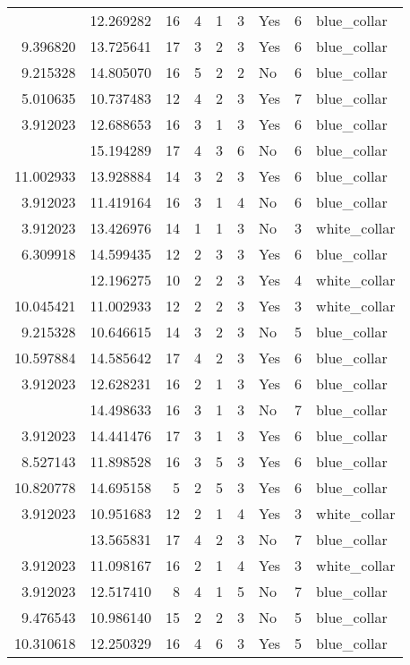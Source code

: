 \documentclass[
]{article}
\begin{document}
\begin{longtable}[t]{rrrrrllrl}
\addlinespace
3.912023 & 12.269282 & 16 & 4 & 1 & 3 & Yes & 6 & blue\_collar\\
9.396820 & 13.725641 & 17 & 3 & 2 & 3 & Yes & 6 & blue\_collar\\
9.215328 & 14.805070 & 16 & 5 & 2 & 2 & No & 6 & blue\_collar\\
5.010635 & 10.737483 & 12 & 4 & 2 & 3 & Yes & 7 & blue\_collar\\
3.912023 & 12.688653 & 16 & 3 & 1 & 3 & Yes & 6 & blue\_collar\\
\addlinespace
8.022897 & 15.194289 & 17 & 4 & 3 & 6 & No & 6 & blue\_collar\\
11.002933 & 13.928884 & 14 & 3 & 2 & 3 & Yes & 6 & blue\_collar\\
3.912023 & 11.419164 & 16 & 3 & 1 & 4 & No & 6 & blue\_collar\\
3.912023 & 13.426976 & 14 & 1 & 1 & 3 & No & 3 & white\_collar\\
6.309918 & 14.599435 & 12 & 2 & 3 & 3 & Yes & 6 & blue\_collar\\
\addlinespace
10.464531 & 12.196275 & 10 & 2 & 2 & 3 & Yes & 4 & white\_collar\\
10.045421 & 11.002933 & 12 & 2 & 2 & 3 & Yes & 3 & white\_collar\\
9.215328 & 10.646615 & 14 & 3 & 2 & 3 & No & 5 & blue\_collar\\
10.597884 & 14.585642 & 17 & 4 & 2 & 3 & Yes & 6 & blue\_collar\\
3.912023 & 12.628231 & 16 & 2 & 1 & 3 & Yes & 6 & blue\_collar\\
\addlinespace
3.912023 & 14.498633 & 16 & 3 & 1 & 3 & No & 7 & blue\_collar\\
3.912023 & 14.441476 & 17 & 3 & 1 & 3 & Yes & 6 & blue\_collar\\
8.527143 & 11.898528 & 16 & 3 & 5 & 3 & Yes & 6 & blue\_collar\\
10.820778 & 14.695158 & 5 & 2 & 5 & 3 & Yes & 6 & blue\_collar\\
3.912023 & 10.951683 & 12 & 2 & 1 & 4 & Yes & 3 & white\_collar\\
\addlinespace
14.077913 & 13.565831 & 17 & 4 & 2 & 3 & No & 7 & blue\_collar\\
3.912023 & 11.098167 & 16 & 2 & 1 & 4 & Yes & 3 & white\_collar\\
3.912023 & 12.517410 & 8 & 4 & 1 & 5 & No & 7 & blue\_collar\\
9.476543 & 10.986140 & 15 & 2 & 2 & 3 & No & 5 & blue\_collar\\
10.310618 & 12.250329 & 16 & 4 & 6 & 3 & Yes & 5 & blue\_collar\\

\end{longtable}
\end{document}
